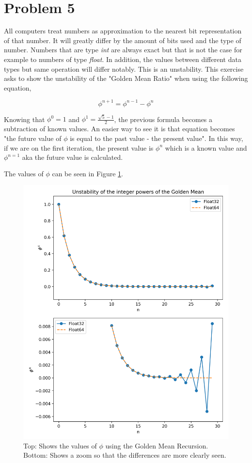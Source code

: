 \section*{Problem 5}

All computers treat numbers as approximation to the nearest bit representation of that number. It will greatly differ by the amount of bits used and the type of number. Numbers that are type \textit{int} are always exact but that is not the case for example to numbers of type \textit{float}. In addition, the values between different data types but same operation will differ notably. This is an unstability. This exercise asks to show the unstability of the "Golden Mean Ratio" when using the following equation, 

\begin{equation}
    \phi^{n+1}=\phi^{n-1}-\phi^{n}
\end{equation}

Knowing that $\phi^0=1$ and $\phi^1=\frac{\sqrt{5}-1}{2}$, the previous formula becomes a subtraction of known values. An easier way to see it is that equation becomes "the future value of $\phi$ is equal to the past value - the present value". In this way, if we are on the first iteration, the present value is $\phi^n$ which is a known value and $\phi^{n=1}$ aka the future value is calculated. 

The values of $\phi$ can be seen in Figure \ref{fig:phi}.

\begin{figure}
    \centering
    \includegraphics{figures/hw01prob1-5fig1.png}
    \caption{Top: Shows the values of $\phi$ using the Golden Mean Recursion. Bottom: Shows a zoom so that the differences are more clearly seen.}
    \label{fig:phi}
\end{figure}